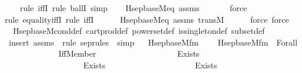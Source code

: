 \begin{isabellebody}
\ \ \ \isamarkupfalse%
{\isacharparenleft}{\kern0pt}rule\ iffI{\isacharcomma}{\kern0pt}\ rule\ ballI{\isacharcomma}{\kern0pt}\ simp{\isacharparenright}{\kern0pt}\isanewline
\ \ \isamarkupfalse%
\ Hsep{\isacharunderscore}{\kern0pt}base{\isacharunderscore}{\kern0pt}M{\isacharunderscore}{\kern0pt}eq\ assms\ \isanewline
\ \ \ \ \isamarkupfalse%
\ force\isanewline
\ \ \isamarkupfalse%
{\isacharparenleft}{\kern0pt}rule\ equality{\isacharunderscore}{\kern0pt}iffI{\isacharcomma}{\kern0pt}\ rule\ iffI{\isacharparenright}{\kern0pt}\ \ \isanewline
\ \ \isamarkupfalse%
\ Hsep{\isacharunderscore}{\kern0pt}base{\isacharunderscore}{\kern0pt}M{\isacharunderscore}{\kern0pt}eq\ assms\ transM\isanewline
\ \ \ \ \isamarkupfalse%
\ {\isacharparenleft}{\kern0pt}force{\isacharcomma}{\kern0pt}\ force{\isacharparenright}{\kern0pt}\isanewline
\ \ \isamarkupfalse%
\ \ Hsep{\isacharunderscore}{\kern0pt}base{\isacharunderscore}{\kern0pt}M{\isacharunderscore}{\kern0pt}cond{\isacharunderscore}{\kern0pt}def\ cartprod{\isacharprime}{\kern0pt}{\isacharunderscore}{\kern0pt}def\ powerset{\isacharprime}{\kern0pt}{\isacharunderscore}{\kern0pt}def\ is{\isacharunderscore}{\kern0pt}singleton{\isacharprime}{\kern0pt}{\isacharunderscore}{\kern0pt}def\ subset{\isacharunderscore}{\kern0pt}def\isanewline
\ \ \isamarkupfalse%
\ {\isacharparenleft}{\kern0pt}insert\ assms\ {\isacharsemicolon}{\kern0pt}\ {\isacharparenleft}{\kern0pt}rule\ sep{\isacharunderscore}{\kern0pt}rules\ {\isacharbar}{\kern0pt}\ simp{\isacharparenright}{\kern0pt}{\isacharplus}{\kern0pt}{\isacharparenright}{\kern0pt}%
\endisatagproof
{\isafoldproof}%
%
\isadelimproof
\ \isanewline
%
\endisadelimproof
\isanewline
{}\isamarkupfalse%
\ Hsep{\isacharunderscore}{\kern0pt}base{\isacharunderscore}{\kern0pt}M{\isacharunderscore}{\kern0pt}fm\ \ \isanewline
\ \ {\isachardoublequoteopen}Hsep{\isacharunderscore}{\kern0pt}base{\isacharunderscore}{\kern0pt}M{\isacharunderscore}{\kern0pt}fm\ {\isasymequiv}\ Forall\isanewline
\ \ \ \ \ \ \ \ \ \ \ \ \ {\isacharparenleft}{\kern0pt}Iff{\isacharparenleft}{\kern0pt}Member{\isacharparenleft}{\kern0pt}{}{\isacharcomma}{\kern0pt}\ {}{\isacharparenright}{\kern0pt}{\isacharcomma}{\kern0pt}\isanewline
\ \ \ \ \ \ \ \ \ \ \ \ \ \ \ \ \ \ Exists\isanewline
\ \ \ \ \ \ \ \ \ \ \ \ \ \ \ \ \ \ \ {\isacharparenleft}{\kern0pt}Exists\isanewline
\ \ \ \ \ \ \ \ \ \ \ \ \ \ \ \ \ \ \ \ \ {\isacharparenleft}{\kern0pt}Exists\isanewline

\end{isabellebody}
